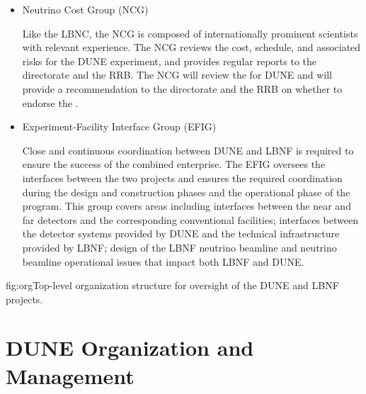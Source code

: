 \begin{itemize}

Upon request from the Fermilab director, the LBNC may employ additional DUNE and LBNF scrutiny groups for more detailed reports and evaluations. 

\item Neutrino Cost Group (NCG)

Like the LBNC, the NCG is composed of internationally prominent scientists with relevant experience.  The NCG reviews the cost, schedule, and associated risks for the DUNE experiment, and provides regular reports to the \fnal directorate and the RRB.  The NCG will review the  for DUNE and will provide a recommendation to the \fnal directorate and the RRB on whether to endorse the .


\item Experiment-Facility Interface Group (EFIG)

Close and continuous coordination between DUNE and LBNF is required to ensure the success of the combined enterprise. The EFIG  oversees the interfaces between the two projects and ensures the required coordination during the design and construction phases and the operational phase of the program. This group covers areas including interfaces between the near and far detectors and the corresponding conventional facilities; interfaces between the detector systems provided by DUNE and the technical infrastructure provided by LBNF; design of the LBNF neutrino beamline and neutrino beamline operational issues that impact both LBNF and DUNE.  

\end{itemize}

\begin{dunefigure}	
{fig:org}{Top-level organization structure for oversight of the DUNE and LBNF projects.}
\end{dunefigure}

\section{DUNE Organization and Management}


